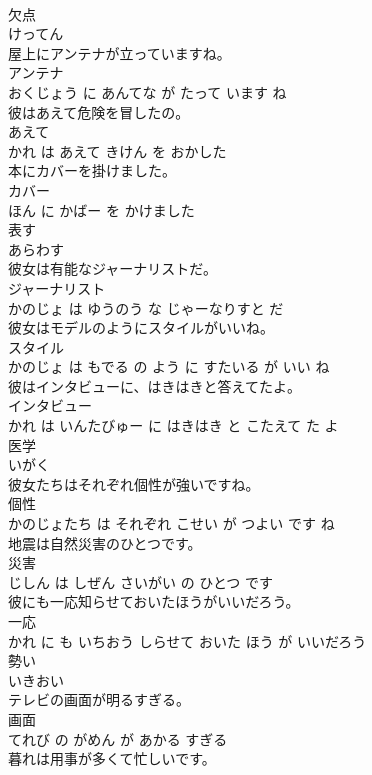 \documentclass[8pt]{extreport}
\begin{document}
\begin{CJK}{UTF8}{min}
\\	欠点	
\\	けってん			
\\	屋上にアンテナが立っていますね。	
\\	アンテナ 
\\	おくじょう に あんてな が たって います ね			
\\	彼はあえて危険を冒したの。	
\\	あえて 
\\	かれ は あえて きけん を おかした			
\\	本にカバーを掛けました。	
\\	カバー 
\\	ほん に かばー を かけました			
\\	表す	
\\	あらわす			
\\	彼女は有能なジャーナリストだ。	
\\	ジャーナリスト 
\\	かのじょ は ゆうのう な じゃーなりすと だ			
\\	彼女はモデルのようにスタイルがいいね。	
\\	スタイル 
\\	かのじょ は もでる の よう に すたいる が いい ね			
\\	彼はインタビューに、はきはきと答えてたよ。	
\\	インタビュー 
\\	かれ は いんたびゅー に はきはき と こたえて た よ			
\\	医学	
\\	いがく			
\\	彼女たちはそれぞれ個性が強いですね。	
\\	個性 
\\	かのじょたち は それぞれ こせい が つよい です ね			
\\	地震は自然災害のひとつです。	
\\	災害 
\\	じしん は しぜん さいがい の ひとつ です			
\\	彼にも一応知らせておいたほうがいいだろう。	
\\	一応 
\\	かれ に も いちおう しらせて おいた ほう が いいだろう			
\\	勢い	
\\	いきおい			
\\	テレビの画面が明るすぎる。	
\\	画面 
\\	てれび の がめん が あかる すぎる			
\\	暮れは用事が多くて忙しいです。	

\end{CJK}
\end{document}
